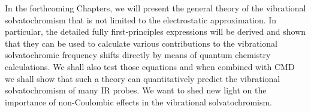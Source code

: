 \documentclass[b5paper,oneside,fleqn,11pt]{book}
\begin{document}
\begin{refsection}
In the forthcoming Chapters, we will present the general theory of the vibrational
solvatochromism that is not limited to the electrostatic approximation. 
In particular, the detailed fully first\hyp{}principles expressions
will be derived and shown 
that they can be used to calculate various contributions to the vibrational solvatochromic frequency
shifts directly by means of quantum chemistry calculations. We shall also test those equations 
and when combined with CMD we shall show that such a theory can quantitatively predict the
vibrational solvatochromism of many IR probes. We want to shed new light
on the importance of non\hyp{}Coulombic effects
in the vibrational solvatochromism.

\printbibliography[heading=subbibintoc,title={References}]
\end{refsection}

\end{document}

